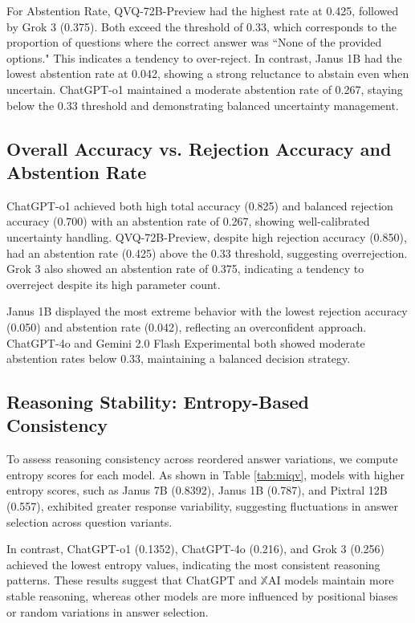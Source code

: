 For Abstention Rate, QVQ-72B-Preview had the highest rate at 0.425, followed by Grok 3 (0.375). Both exceed the threshold of 0.33, which corresponds to the proportion of questions where the correct answer was ``None of the provided options." This indicates a tendency to over-reject. In contrast, Janus 1B had the lowest abstention rate at 0.042, showing a strong reluctance to abstain even when uncertain. ChatGPT-o1 maintained a moderate abstention rate of 0.267, staying below the 0.33 threshold and demonstrating balanced uncertainty management.

\subsection{Overall Accuracy vs. Rejection Accuracy and Abstention Rate}

ChatGPT-o1 achieved both high total accuracy (0.825) and balanced rejection accuracy (0.700) with an abstention rate of 0.267, showing well-calibrated uncertainty handling. QVQ-72B-Preview, despite high rejection accuracy (0.850), had an abstention rate (0.425) above the 0.33 threshold, suggesting overrejection. Grok 3 also showed an abstention rate of 0.375, indicating a tendency to overreject despite its high parameter count.

Janus 1B displayed the most extreme behavior with the lowest rejection accuracy (0.050) and abstention rate (0.042), reflecting an overconfident approach. ChatGPT-4o and Gemini 2.0 Flash Experimental both showed moderate abstention rates below 0.33, maintaining a balanced decision strategy.

\subsection{Reasoning Stability: Entropy-Based Consistency}

To assess reasoning consistency across reordered answer variations, we compute entropy scores for each model. As shown in Table \ref{tab:miqv}, models with higher entropy scores, such as Janus 7B (0.8392), Janus 1B (0.787), and Pixtral 12B (0.557), exhibited greater response variability, suggesting fluctuations in answer selection across question variants.

In contrast, ChatGPT-o1 (0.1352), ChatGPT-4o (0.216), and Grok 3 (0.256) achieved the lowest entropy values, indicating the most consistent reasoning patterns. These results suggest that ChatGPT and $\mathbb{X}$AI \normalsize models maintain more stable reasoning, whereas other models are more influenced by positional biases or random variations in answer selection.


